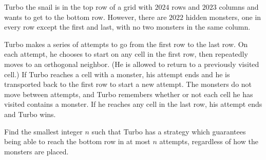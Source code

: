 Turbo the snail is in the top row of a grid with $2024$ rows and $2023$ columns
and wants to get to the bottom row.
However, there are $2022$ hidden monsters, one in every row except the first and last,
with no two monsters in the same column.

Turbo makes a series of attempts to go from the first row to the last row.
On each attempt, he chooses to start on any cell in the first row,
then repeatedly moves to an orthogonal neighbor.
(He is allowed to return to a previously visited cell.)
If Turbo reaches a cell with a monster,
his attempt ends and he is transported back to the first row to start a new attempt.
The monsters do not move between attempts, and Turbo remembers whether or not each cell
he has visited contains a monster.
If he reaches any cell in the last row, his attempt ends and Turbo wins.

Find the smallest integer $n$ such that Turbo has a strategy which guarantees
being able to reach the bottom row in at most $n$ attempts,
regardless of how the monsters are placed.